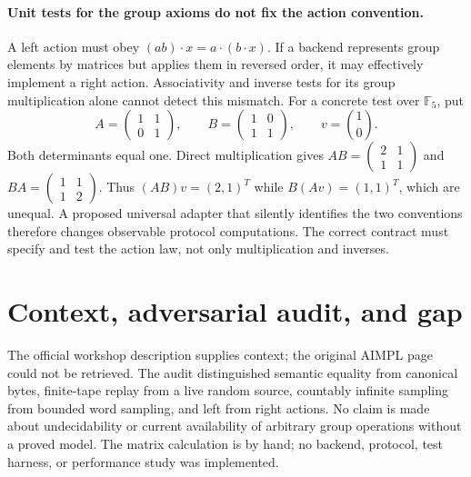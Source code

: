 \documentclass[11pt]{article}
\begin{document}
\paragraph{Unit tests for the group axioms do not fix the action convention.}
A left action must obey $(ab)\cdot x=a\cdot(b\cdot x)$.
If a backend represents group elements by matrices but applies them in reversed
order, it may effectively implement a right action. Associativity and inverse
tests for its group multiplication alone cannot detect this mismatch.
For a concrete test over $\mathbb F_5$, put
\[
A=\begin{pmatrix}1&1\\0&1\end{pmatrix},\qquad
B=\begin{pmatrix}1&0\\1&1\end{pmatrix},\qquad v=\binom10.
\]
Both determinants equal one. Direct multiplication gives
$AB=\left(\begin{smallmatrix}2&1\\1&1\end{smallmatrix}\right)$ and
$BA=\left(\begin{smallmatrix}1&1\\1&2\end{smallmatrix}\right)$.
Thus $(AB)v=(2,1)^T$ while $B(Av)=(1,1)^T$, which are unequal.
A proposed universal adapter that silently identifies the two conventions
therefore changes observable protocol computations. The correct contract must
specify and test the action law, not only multiplication and inverses.

\section{Context, adversarial audit, and gap}
The official workshop description supplies context; the original AIMPL page
could not be retrieved. The audit distinguished semantic equality from
canonical bytes, finite-tape replay from a live random source, countably
infinite sampling from bounded word sampling, and left from right actions.
No claim is made about undecidability or current availability of arbitrary
group operations without a proved model. The matrix calculation is by hand;
no backend, protocol, test harness, or performance study was implemented.
\end{document}

